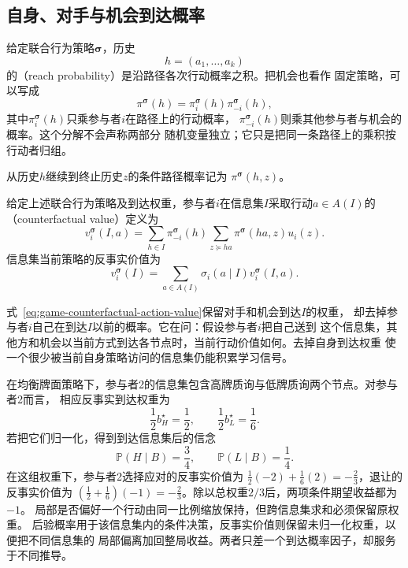 \subsection{自身、对手与机会到达概率}

给定联合行为策略\(\bm{\sigma}\)，历史
\[
  h=(a_1,\ldots,a_k)
\]
的（reach probability）是沿路径各次行动概率之积。把机会也看作
固定策略，可以写成
\begin{equation}
  \pi^{\bm{\sigma}}(h)
  =
  \pi_i^{\bm{\sigma}}(h)
  \pi_{-i}^{\bm{\sigma}}(h),
  \label{eq:game-reach-factorization}
\end{equation}
其中\(\pi_i^{\bm{\sigma}}(h)\)只乘参与者\(i\)在路径上的行动概率，
\(\pi_{-i}^{\bm{\sigma}}(h)\)则乘其他参与者与机会的概率。这个分解不会声称两部分
随机变量独立；它只是把同一条路径上的乘积按行动者归组。

从历史\(h\)继续到终止历史\(z\)的条件路径概率记为
\(\pi^{\bm{\sigma}}(h,z)\)。
\begin{definition}[反事实价值]
\label{def:game-counterfactual-value}
给定上述联合行为策略及到达权重，参与者\(i\)在信息集\(I\)采取行动\(a\in A(I)\)的
（counterfactual value）定义为
\begin{equation}
  v_i^{\bm{\sigma}}(I,a)
  =
  \sum_{h\in I}
  \pi_{-i}^{\bm{\sigma}}(h)
  \sum_{z\succeq ha}
  \pi^{\bm{\sigma}}(ha,z)u_i(z).
  \label{eq:game-counterfactual-action-value}
\end{equation}
信息集当前策略的反事实价值为
\begin{equation}
  v_i^{\bm{\sigma}}(I)
  =
  \sum_{a\in A(I)}
  \sigma_i(a\mid I)
  v_i^{\bm{\sigma}}(I,a).
  \label{eq:game-counterfactual-value}
\end{equation}

\end{definition}
式~\eqref{eq:game-counterfactual-action-value}保留对手和机会到达\(I\)的权重，
却去掉参与者\(i\)自己在到达\(I\)以前的概率。它在问：假设参与者\(i\)把自己送到
这个信息集，其他方和机会以当前方式到达各节点时，当前行动价值如何。去掉自身到达权重
使一个很少被当前自身策略访问的信息集仍能积累学习信号。

在均衡牌面策略下，参与者2的信息集包含高牌质询与低牌质询两个节点。对参与者2而言，
相应反事实到达权重为
\[
  \frac12 b_H^\star=\frac12,
  \qquad
  \frac12 b_L^\star=\frac16.
\]
若把它们归一化，得到到达信息集后的信念
\[
  \mathbb{P}(H\mid B)=\frac34,\qquad
  \mathbb{P}(L\mid B)=\frac14.
\]
在这组权重下，参与者2选择应对的反事实价值为
$\frac12(-2)+\frac16(2)=-\frac23$，退让的反事实价值为
$(\frac12+\frac16)(-1)=-\frac23$。除以总权重$2/3$后，两项条件期望收益都为$-1$。
局部是否偏好一个行动由同一比例缩放保持，但跨信息集求和必须保留原权重。
后验概率用于该信息集内的条件决策，反事实价值则保留未归一化权重，以便把不同信息集的
局部偏离加回整局收益。两者只差一个到达概率因子，却服务于不同推导。

